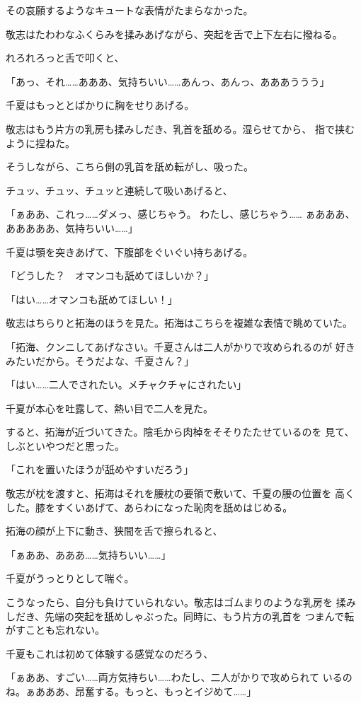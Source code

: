 ﻿\documentclass[
    book,tate,
    line_length=30zw,
    jafontsize=12pt,
    paper=b5j,
    landscape,
    ]{jlreq}
\begin{document}
その哀願するようなキュートな表情がたまらなかった。

敬志はたわわなふくらみを揉みあげながら、突起を舌で上下左右に撥ねる。

れろれろっと舌で叩くと、

「あっ、それ……あああ、気持ちいい……あんっ、あんっ、あああううう」

千夏はもっととばかりに胸をせりあげる。

敬志はもう片方の乳房も揉みしだき、乳首を舐める。湿らせてから、
指で挟むように捏ねた。

そうしながら、こちら側の乳首を舐め転がし、吸った。

チュッ、チュッ、チュッと連続して吸いあげると、

「ぁああ、これっ……ダメっ、感じちゃう。 わたし、感じちゃう……
ぁあああ、あああああ、気持ちいい……」

千夏は顎を突きあげて、下腹部をぐいぐい持ちあげる。

「どうした？　オマンコも舐めてほしいか？」

「はい……オマンコも舐めてほしい！」

敬志はちらりと拓海のほうを見た。拓海はこちらを複雑な表情で眺めていた。

「拓海、クンニしてあげなさい。千夏さんは二人がかりで攻められるのが
好きみたいだから。そうだよな、千夏さん？」

「はい……二人でされたい。メチャクチャにされたい」

千夏が本心を吐露して、熱い目で二人を見た。

すると、拓海が近づいてきた。陰毛から肉棹をそそりたたせているのを
見て、しぶといやつだと思った。

「これを置いたほうが舐めやすいだろう」

敬志が枕を渡すと、拓海はそれを腰枕の要領で敷いて、千夏の腰の位置を
高くした。膝をすくいあげて、あらわになった恥肉を舐めはじめる。

拓海の顔が上下に動き、狭間を舌で擦られると、

「ぁああ、あああ……気持ちいい……」

千夏がうっとりとして喘ぐ。

こうなったら、自分も負けていられない。敬志はゴムまりのような乳房を
揉みしだき、先端の突起を舐めしゃぶった。同時に、もう片方の乳首を
つまんで転がすことも忘れない。

千夏もこれは初めて体験する感覚なのだろう、

「ぁああ、すごい……両方気持ちい……わたし、二人がかりで攻められて
いるのね。ぁあああ、昂奮する。もっと、もっとイジめて……」
\end{document}
